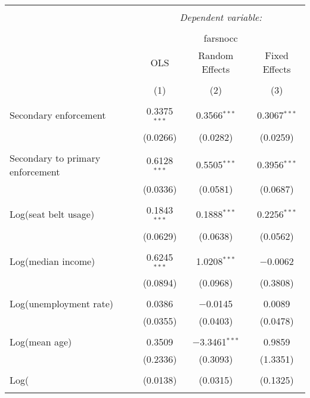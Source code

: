 
\begin{table}[!htbp] \centering 
  \caption{} 
  \label{} 
\begin{tabular}{@{\extracolsep{5pt}}lccc} 
\\[-1.8ex]\hline 
\hline \\[-1.8ex] 
 & \multicolumn{3}{c}{\textit{Dependent variable:}} \\ 
\cline{2-4} 
\\[-1.8ex] & \multicolumn{3}{c}{farsnocc} \\ 
 & OLS & Random Effects & Fixed Effects \\ 
\\[-1.8ex] & (1) & (2) & (3)\\ 
\hline \\[-1.8ex] 
 Secondary enforcement & 0.3375$^{***}$ & 0.3566$^{***}$ & 0.3067$^{***}$ \\ 
  & (0.0266) & (0.0282) & (0.0259) \\ 
  & & & \\ 
 Secondary to primary enforcement & 0.6128$^{***}$ & 0.5505$^{***}$ & 0.3956$^{***}$ \\ 
  & (0.0336) & (0.0581) & (0.0687) \\ 
  & & & \\ 
 Log(seat belt usage) & 0.1843$^{***}$ & 0.1888$^{***}$ & 0.2256$^{***}$ \\ 
  & (0.0629) & (0.0638) & (0.0562) \\ 
  & & & \\ 
 Log(median income) & 0.6245$^{***}$ & 1.0208$^{***}$ & $-$0.0062 \\ 
  & (0.0894) & (0.0968) & (0.3808) \\ 
  & & & \\ 
 Log(unemployment rate) & 0.0386 & $-$0.0145 & 0.0089 \\ 
  & (0.0355) & (0.0403) & (0.0478) \\ 
  & & & \\ 
 Log(mean age) & 0.3509 & $-$3.3461$^{***}$ & 0.9859 \\ 
  & (0.2336) & (0.3093) & (1.3351) \\ 
  & & & \\ 
 Log(%
  & (0.0138) & (0.0315) & (0.1325) \\ 
  & & & \\ 

\end{tabular}
\end{table}
